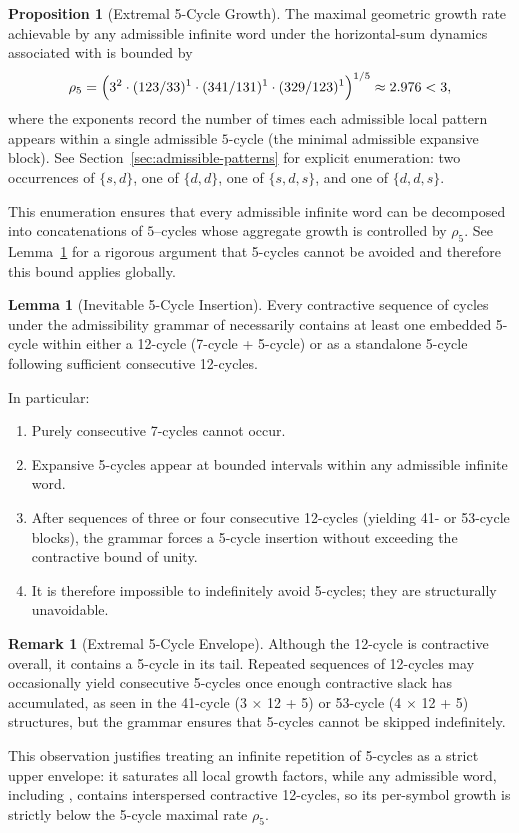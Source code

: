 \documentclass[12pt, oneside]{article}   	%
\numberwithin{equation}{section}          %
\theoremstyle{definition}
\newtheorem{proposition}{Proposition}[section]
\newtheorem{lemma}[theorem]{Lemma}
\newtheorem*{remark}{Remark}
\begin{document}
\begin{proposition}[Extremal 5-Cycle Growth]
\label{prop:extremal-5-cycle}
The maximal geometric growth rate achievable by any admissible infinite
word under the horizontal-sum dynamics associated with  is bounded by
\[
\rho_{5}
=
\Bigl(
3^{2}
\cdot (123/33)^1
\cdot (341/131)^1
\cdot (329/123)^1
\Bigr)^{1/5}
\approx 2.976
< 3,
\]
where the exponents record the number of times each admissible local pattern
appears within a single admissible $5$-cycle (the minimal admissible expansive
block).  See Section~\ref{sec:admissible-patterns} for explicit enumeration:
two occurrences of $\{s,d\}$, one of $\{d,d\}$, one of $\{s,d,s\}$, and one
of $\{d,d,s\}$.

This enumeration ensures that every admissible infinite word can be decomposed
into concatenations of $5$--cycles whose aggregate growth is controlled by
\(\rho_5\). See Lemma~\ref{lem:inevitable-5-cycle} for a rigorous argument
that 5-cycles cannot be avoided and therefore this bound applies globally.
\end{proposition}

\begin{lemma}[Inevitable 5-Cycle Insertion]
\label{lem:inevitable-5-cycle}
Every contractive sequence of cycles under the admissibility grammar of 
necessarily contains at least one embedded 5-cycle within either a 12-cycle (7-cycle + 5-cycle) 
or as a standalone 5-cycle following sufficient consecutive 12-cycles. 

\newpage
In particular:
\begin{enumerate}
    \item Purely consecutive 7-cycles cannot occur.
    \item Expansive 5-cycles appear at bounded intervals within any admissible infinite word.
    \item After sequences of three or four consecutive 12-cycles (yielding 41- or 53-cycle blocks),
          the grammar forces a 5-cycle insertion without exceeding the contractive bound of unity.
    \item It is therefore impossible to indefinitely avoid 5-cycles; they are structurally unavoidable.
\end{enumerate}
\end{lemma}

\begin{remark}[Extremal 5-Cycle Envelope]
Although the 12-cycle is contractive overall, it contains a 5-cycle in its tail. 
Repeated sequences of 12-cycles may occasionally yield consecutive 5-cycles once 
enough contractive slack has accumulated, as seen in the 41-cycle (3 × 12 + 5) 
or 53-cycle (4 × 12 + 5) structures, but the grammar ensures that 5-cycles 
cannot be skipped indefinitely. 

This observation justifies treating an infinite repetition of 5-cycles as a strict upper envelope: 
it saturates all local growth factors, while any admissible word, including , 
contains interspersed contractive 12-cycles, so its per-symbol growth is strictly below 
the 5-cycle maximal rate $\rho_5$.
\end{remark}
\end{document}
